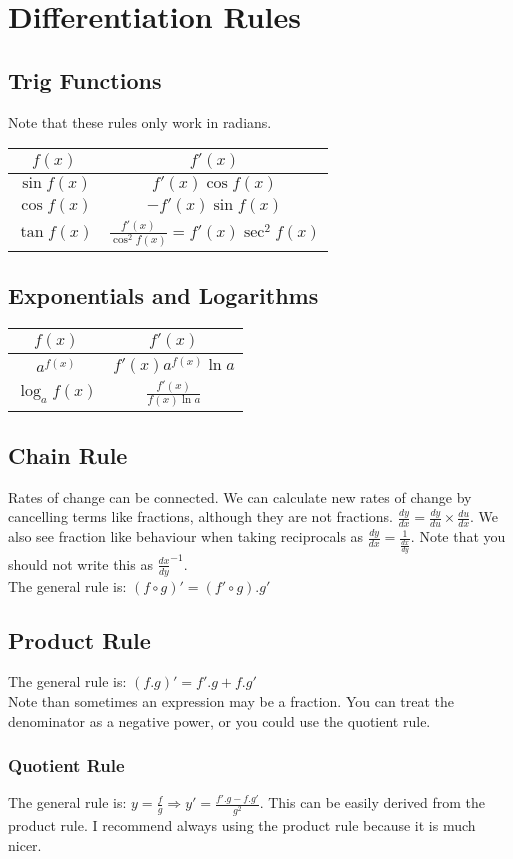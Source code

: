 \documentclass[class=article, crop=false]{standalone}
\begin{document}
\section*{Differentiation Rules}
\subsection*{Trig Functions}
Note that these rules only work in radians. \\
\begin{tabular}{ c c }
\hline
	 $f(x)$ & $f'(x)$  \\ 
\hline
	$\sin f(x)$ & $f'(x) \cos f(x)$ \\
	$\cos f(x)$ & $-f'(x) \sin f(x)$ \\
	$\tan f(x)$ & $\frac{f'(x)}{\cos^2 f(x)} = f'(x)\sec^2 f(x)$ \\
\hline
\end{tabular}
\subsection*{Exponentials and Logarithms}
\begin{tabular}{ c c }
\hline
	 $f(x)$ & $f'(x)$  \\ 
\hline
	$a^{f(x)}$ & $f'(x) a^{f(x)} \ln a$ \\
	$\log_a f(x)$ & $\frac{f'(x)}{f(x)\ln a}$	 \\
\hline
\end{tabular}
\subsection*{Chain Rule}
Rates of change can be connected. We can calculate new rates of change by cancelling terms like fractions, although they are not fractions. $\frac{dy}{dx} = \frac{dy}{du} \times \frac{du}{dx}$. We also see fraction like behaviour when taking reciprocals as $\frac{dy}{dx} = \frac{1}{\frac{dx}{dy}}$. Note that you should not write this as $\frac{dx}{dy}^{-1}$. \\
The general rule is: $(f \circ g)' = (f' \circ g).g'$
\subsection*{Product Rule}
The general rule is: $(f.g)' = f'.g + f.g'$ \\
Note than sometimes an expression may be a fraction. You can treat the denominator as a negative power, or you could use the quotient rule. 
\subsubsection*{Quotient Rule}
The general rule is: $y = \frac{f}{g} \Rightarrow y' = \frac{f'.g - f.g'}{g^2}$. This can be easily derived from the product rule. I recommend always using the product rule because it is much nicer. 
\end{document}
